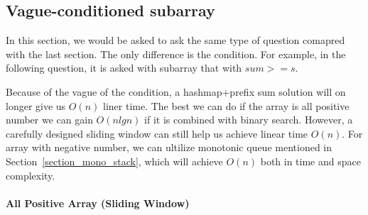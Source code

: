 \documentclass[../main.tex]{subfiles}
\begin{document}
\subsection{Vague-conditioned subarray}
In this section, we would be asked to ask the same type of question comapred with the last section. The only difference is the condition. For example, in the following question, it is asked with subarray that with $sum >= s$. 

Because of the vague of the condition, a hashmap$+$prefix sum solution will on longer give us $O(n)$ liner time. The best we can do if the array is all positive number we can gain $O(nlgn)$ if it is combined with binary search. However, a carefully designed sliding window can still help us achieve linear time $O(n)$. For array with negative number, we can ultilize monotonic queue mentioned in Section~\ref{section_mono_stack}, which will achieve $O(n)$ both in time and space complexity. 

\paragraph{All Positive Array (Sliding Window)}
\end{document}
